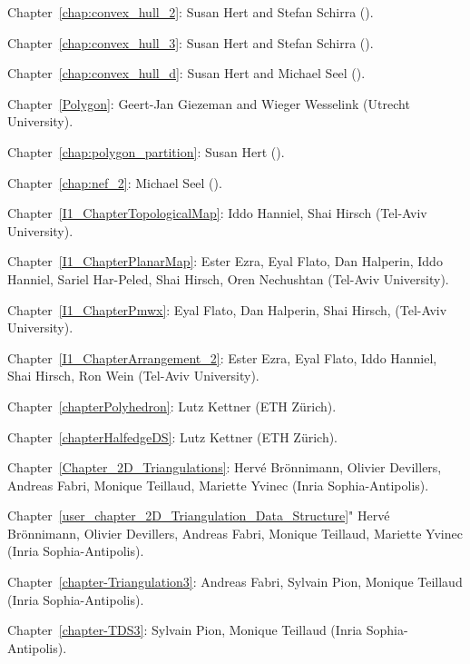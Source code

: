 \noindent
Chapter~\ref{chap:convex_hull_2}: Susan Hert and Stefan Schirra 
().

\noindent
Chapter~\ref{chap:convex_hull_3}: Susan Hert and Stefan Schirra 
().

\noindent
Chapter~\ref{chap:convex_hull_d}: Susan Hert and Michael Seel 
().

\noindent
Chapter~\ref{Polygon}: Geert-Jan Giezeman and Wieger Wesselink 
(Utrecht University).

\noindent
Chapter~\ref{chap:polygon_partition}: Susan Hert 
().

\noindent
Chapter~\ref{chap:nef_2}: Michael Seel 
().

\noindent
Chapter~\ref{I1_ChapterTopologicalMap}: Iddo Hanniel, Shai Hirsch 
(Tel-Aviv University).

\noindent
Chapter~\ref{I1_ChapterPlanarMap}: Ester Ezra, Eyal Flato, Dan Halperin, 
Iddo Hanniel, Sariel Har-Peled, Shai Hirsch, Oren Nechushtan 
(Tel-Aviv University).

\noindent
Chapter~\ref{I1_ChapterPmwx}: Eyal Flato, Dan Halperin, Shai Hirsch,
(Tel-Aviv University).

\noindent
Chapter~\ref{I1_ChapterArrangement_2}: Ester Ezra, Eyal Flato, 
Iddo Hanniel, Shai Hirsch, Ron Wein (Tel-Aviv University).


\noindent
Chapter~\ref{chapterPolyhedron}: Lutz Kettner (ETH Z\"urich).

\noindent
Chapter~\ref{chapterHalfedgeDS}: Lutz Kettner (ETH Z\"urich).

\noindent
Chapter~\ref{Chapter_2D_Triangulations}: 
Herv\'e Br\"onnimann, Olivier Devillers, Andreas Fabri,
Monique Teillaud, Mariette Yvinec ({\sc Inria} Sophia-Antipolis).

\noindent
Chapter~\ref{user_chapter_2D_Triangulation_Data_Structure}"
Herv\'e Br\"onnimann, Olivier Devillers, Andreas Fabri,
Monique Teillaud, Mariette Yvinec ({\sc Inria} Sophia-Antipolis).


\noindent
Chapter~\ref{chapter-Triangulation3}: 
Andreas Fabri, Sylvain Pion, Monique Teillaud ({\sc Inria} Sophia-Antipolis).

\noindent
Chapter~\ref{chapter-TDS3}: 
Sylvain Pion, Monique Teillaud ({\sc Inria} Sophia-Antipolis).

